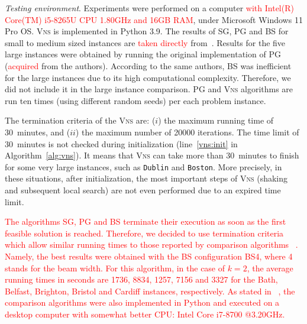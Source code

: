 \documentclass[dvipsnames,format=sigconf]{acmart} %
\begin{document}
 \emph{Testing environment}. Experiments were performed on a computer \textcolor{red}{with Intel(R) Core(TM) i5-8265U CPU 1.80GHz and 16GB RAM}, under Microsoft Windows 11 Pro OS. \textsc{Vns} is implemented in Python 3.9. The results of SG, PG and BS for small to medium sized instances are \textcolor{red}{taken directly} from~\cite{corcoran2021heuristics}. Results for the five large instances were obtained by running the original implementation of PG (\textcolor{red}{acquired} from the authors). According to the same authors, BS was inefficient for the large instances due to its high computational complexity. Therefore, we did not include it in the large instance comparison.  
 PG and \textsc{Vns} algorithms are run ten times (using different random seeds) per each problem instance. 
   
  The termination criteria of the \textsc{Vns} are: ($i$) the maximum running time of 30~minutes, and ($ii$) the maximum number of 20000 iterations. The time limit of 30~minutes is not checked during initialization (line~\ref{vns:init} in Algorithm~\ref{alg:vns}). It means that \textsc{Vns} can take more than 30~minutes to finish for some very large instances, such as \texttt{Dublin} and \texttt{Boston}. More precisely, in these situations, after initialization, the most important steps of \textsc{Vns} (shaking and subsequent local search) are not even performed due to an expired time limit.
  
  \textcolor{red}{The algorithms SG, PG and BS terminate their execution as soon as the first feasible solution is reached. Therefore, we decided to use termination criteria which allow similar running times to those reported by comparison algorithms ~\cite{corcoran2021heuristics}. Namely, the best results were obtained with the BS configuration BS4, where 4 stands for the beam width. For this algorithm, in the case of $k=2$, the average running times in seconds are 1736, 8834, 1257, 7156 and 3327 for the Bath, Belfast, Brighton, Bristol and Cardiff instances, respectively.} \textcolor{red}{As stated in ~\cite{corcoran2021heuristics}, the comparison algorithms were also implemented in  Python and executed on a desktop computer with somewhat better CPU: Intel Core i7-8700 @3.20GHz. }
   
\end{document}
